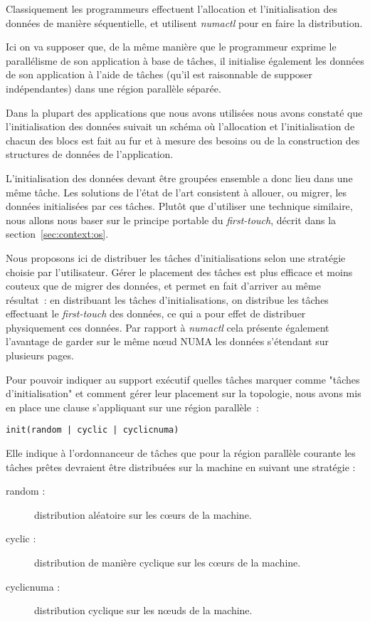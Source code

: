 Classiquement les programmeurs effectuent l'allocation et l'initialisation des données de manière séquentielle, et utilisent \emph{numactl} pour en faire la distribution.

Ici on va supposer que, de la même manière que le programmeur exprime le parallélisme de son application à base de tâches, il initialise également les données de son application à l'aide de tâches (qu'il est raisonnable de supposer indépendantes) dans une région parallèle séparée.

Dans la plupart des applications que nous avons utilisées nous avons constaté que l'initialisation des données suivait un schéma où l'allocation et l'initialisation de chacun des blocs est fait au fur et à mesure des besoins ou de la construction des structures de données de l'application.

L'initialisation des données devant être groupées ensemble a donc lieu dans une même tâche.
Les solutions de l'état de l'art consistent à allouer, ou migrer, les données initialisées par ces tâches.
Plutôt que d'utiliser une technique similaire, nous allons nous baser sur le principe portable du \emph{first-touch}, décrit dans la section~\ref{sec:context:os}.

Nous proposons ici de distribuer les tâches d'initialisations selon une stratégie choisie par l'utilisateur.
Gérer le placement des tâches est plus efficace et moins couteux que de migrer des données, et permet en fait d'arriver au même résultat~: en distribuant les tâches d'initialisations, on distribue les tâches effectuant le \emph{first-touch} des données, ce qui a pour effet de distribuer physiquement ces données.
Par rapport à \emph{numactl} cela présente également l'avantage de garder sur le même nœud NUMA les données s'étendant sur plusieurs pages.


Pour pouvoir indiquer au support exécutif quelles tâches marquer comme "tâches d'initialisation" et comment gérer leur placement sur la topologie, nous avons mis en place une clause s'appliquant sur une région parallèle~:

\begin{lstlisting}
init(random | cyclic | cyclicnuma)
\end{lstlisting}

Elle indique à l'ordonnanceur de tâches que pour la région parallèle courante les tâches prêtes devraient être distribuées sur la machine en suivant une stratégie :

\begin{description}
  \item [random :]
    distribution aléatoire sur les cœurs de la machine.
  \item [cyclic :]
    distribution de manière cyclique sur les cœurs de la machine.
  \item [cyclicnuma :]
    distribution cyclique sur les nœuds de la machine.
\end{description}


